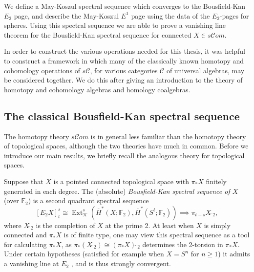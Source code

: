 \documentclass[11pt]{amsart} \renewcommand{\baselinestretch}{1.2}
\theoremstyle{plain}
\theoremstyle{definition}
\DeclareMathOperator{\Ext}{Ext}
\newcommand{\scrC}{\mathscr{C}}
\newcommand{\calk}{\mathcal{K}}
\newcommand{\calc}{\mathcal{C}}
\newcommand{\F}{\mathbb{F}}
\newcommand{\algs}{{\scrC\!\textit{om}}}
\newcommand{\Ftwo}{\F_2}
\newcommand{\E}[5]{[E^{#1}_{#2}#3]^{#4}_{#5}}
\begin{document}
\begin{Introduction}
We define a May-Koszul spectral sequence which converges to the Bousfield-Kan $E_2$ page, and describe the May-Koszul $E^1$ page using the data of the $E_2$-pages for spheres. Using this spectral sequence we are able to prove a vanishing line theorem for the Bousfield-Kan spectral sequence for connected $X\in s\algs$.

In order to construct the  various operations needed for this thesis, it was helpful to construct a framework in which many of the classically known homotopy and cohomology operations of $s\calc$, for various categories $\calc$ of universal algebras, may be considered together. We do this after giving an introduction to the theory of homotopy and cohomology algebras and homology coalgebras.


\subsection{The classical Bousfield-Kan spectral sequence}
\label{Classicalstuff}
The homotopy theory $s\algs$ is in general less familiar than the homotopy theory of topological spaces, although the two theories have much in common. Before we introduce our main results, we briefly recall the analogous theory for topological spaces.

Suppose that $X$ is a pointed connected topological space with $\pi_*X$ finitely generated in each degree. 
The (absolute) \emph{Bousfield-Kan spectral sequence of $X$} (over $\Ftwo$) is a second quadrant spectral sequence
\[\E{}{2}{X}{s}{t}\cong \Ext^s_{\calk}(\overline{H}^*(X;\Ftwo),\overline{H}^*(S^t;\Ftwo))\implies \pi_{t-s}X\hat{\ }_{\!\!\!2},\]
where $X\hat{\ }_{\!\!\!2}$ is the completion of $X$ at the prime 2. 
At least when $X$ is simply connected and $\pi_*X$ is of finite type, one may view this spectral sequence as  a tool for calculating $\pi_*X$, as
$\pi_*(X\hat{\ }_{\!\!\!2})\cong (\pi_*X)\hat{\ }_{\!\!\!2}$
determines the 2-torsion in $\pi_*X$. Under certain hypotheses (satisfied for example when $X=S^n$ for $n\geq1$) it admits a vanishing line at $E_2$  \cite{MR0266212}, and is thus strongly convergent.


\end{Introduction}
\end{document}
